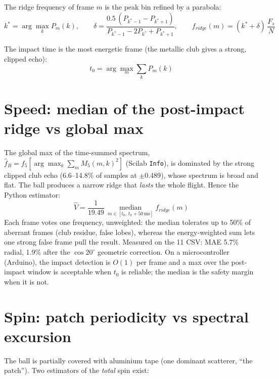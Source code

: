 \documentclass[10pt,a4paper]{report}
\begin{document}
The ridge frequency of frame $m$ is the peak bin refined by a parabola:
\begin{equation}
k^* = \arg\max_k P_m(k), \qquad
\delta = \frac{0.5\,(P_{k^*-1}-P_{k^*+1})}{P_{k^*-1}-2P_{k^*}+P_{k^*+1}}, \qquad
f_{ridge}(m) = (k^*+\delta)\,\frac{F_s}{N}
\end{equation}

The impact time is the most energetic frame (the metallic club gives a strong, clipped echo):
\begin{equation}
t_0 = \arg\max_m \sum_k P_m(k)
\end{equation}

\section{Speed: median of the post-impact ridge vs global max}

The global max of the time-summed spectrum, $\hat f_B = f_5[\arg\max_k \sum_m M_5(m,k)^2]$ (Scilab \texttt{Info}), is dominated by the strong clipped club echo (6.6--14.8\% of samples at $\pm0.489$), whose spectrum is broad and flat. The ball produces a narrow ridge that \emph{lasts} the whole flight. Hence the Python estimator:
\begin{equation}
\hat V = \frac{1}{19.49}\,\operatorname*{median}_{m\in[t_0,\,t_0+50\,\text{ms}]} f_{ridge}(m)
\end{equation}
Each frame votes one frequency, unweighted: the median tolerates up to 50\% of aberrant frames (club residue, false lobes), whereas the energy-weighted sum lets one strong false frame pull the result. Measured on the 11 CSV: MAE 5.7\% radial, 1.9\% after the $\cos 20^\circ$ geometric correction. On a microcontroller (Arduino), the impact detection is $O(1)$ per frame and a max over the post-impact window is acceptable when $t_0$ is reliable; the median is the safety margin when it is not.

\section{Spin: patch periodicity vs spectral excursion}

The ball is partially covered with aluminium tape (one dominant scatterer, ``the patch''). Two estimators of the \emph{total} spin exist:
\end{document}

